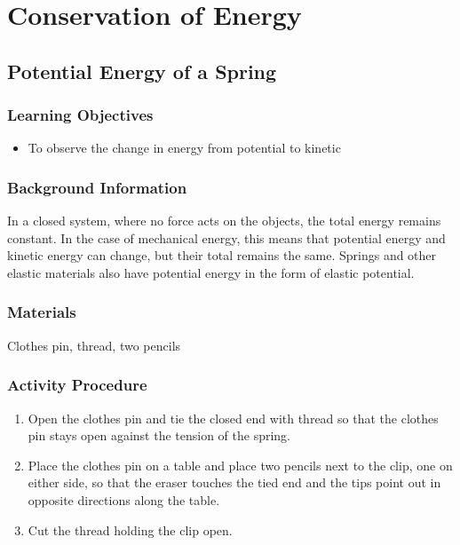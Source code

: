 \section{Conservation of Energy}

\subsection{Potential Energy of a Spring}

\subsubsection*{Learning Objectives}
\begin{itemize}
\item{To observe the change in energy from potential to kinetic}
\end{itemize}

\subsubsection*{Background Information}
In a closed system, where no force acts on the objects, the total energy remains constant.  In the case of mechanical energy, this means that potential energy and kinetic energy can change, but their total remains the same.  Springs and other elastic materials also have potential energy in the form of elastic potential.

\subsubsection{Materials} 
Clothes pin, thread, two pencils\\

\subsubsection{Activity Procedure}
\begin{enumerate}
\item{Open the clothes pin and tie the closed end with thread so that the
clothes pin stays open against the tension of the spring.}
\item{Place the clothes pin on a table and place two pencils next to the clip, one on either side, so that the
eraser touches the tied end and the tips point out in opposite directions
along the table.}
\item{Cut the thread holding the clip open.}
\end{enumerate}

